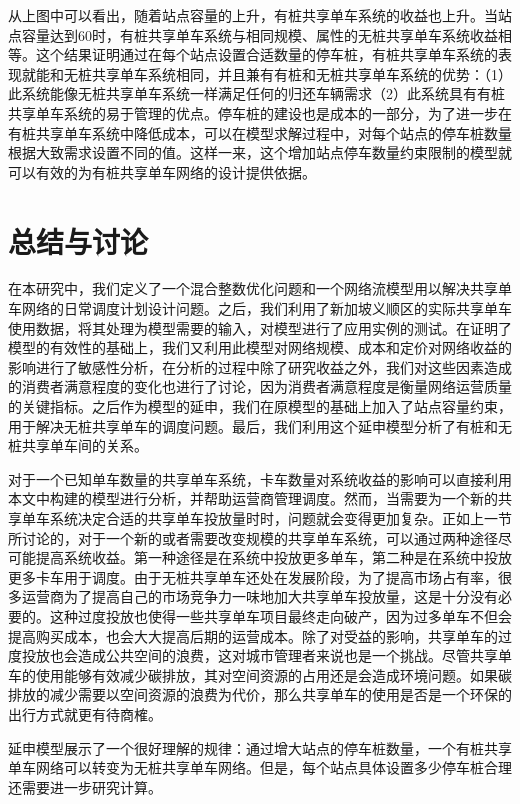 \documentclass[]{tongjithesis}
\numberwithin{equation}{chapter}
\begin{document}
从上图中可以看出，随着站点容量的上升，有桩共享单车系统的收益也上升。当站点容量达到60时，有桩共享单车系统与相同规模、属性的无桩共享单车系统收益相等。这个结果证明通过在每个站点设置合适数量的停车桩，有桩共享单车系统的表现就能和无桩共享单车系统相同，并且兼有有桩和无桩共享单车系统的优势：（1）此系统能像无桩共享单车系统一样满足任何的归还车辆需求（2）此系统具有有桩共享单车系统的易于管理的优点。停车桩的建设也是成本的一部分，为了进一步在有桩共享单车系统中降低成本，可以在模型求解过程中，对每个站点的停车桩数量根据大致需求设置不同的值。这样一来，这个增加站点停车数量约束限制的模型就可以有效的为有桩共享单车网络的设计提供依据。
\clearpage
\chapter{总结与讨论}
在本研究中，我们定义了一个混合整数优化问题和一个网络流模型用以解决共享单车网络的日常调度计划设计问题。之后，我们利用了新加坡义顺区的实际共享单车使用数据，将其处理为模型需要的输入，对模型进行了应用实例的测试。在证明了模型的有效性的基础上，我们又利用此模型对网络规模、成本和定价对网络收益的影响进行了敏感性分析，在分析的过程中除了研究收益之外，我们对这些因素造成的消费者满意程度的变化也进行了讨论，因为消费者满意程度是衡量网络运营质量的关键指标。之后作为模型的延申，我们在原模型的基础上加入了站点容量约束，用于解决无桩共享单车的调度问题。最后，我们利用这个延申模型分析了有桩和无桩共享单车间的关系。

对于一个已知单车数量的共享单车系统，卡车数量对系统收益的影响可以直接利用本文中构建的模型进行分析，并帮助运营商管理调度。然而，当需要为一个新的共享单车系统决定合适的共享单车投放量时时，问题就会变得更加复杂。正如上一节所讨论的，对于一个新的或者需要改变规模的共享单车系统，可以通过两种途径尽可能提高系统收益。第一种途径是在系统中投放更多单车，第二种是在系统中投放更多卡车用于调度。由于无桩共享单车还处在发展阶段，为了提高市场占有率，很多运营商为了提高自己的市场竞争力一味地加大共享单车投放量，这是十分没有必要的。这种过度投放也使得一些共享单车项目最终走向破产，因为过多单车不但会提高购买成本，也会大大提高后期的运营成本。除了对受益的影响，共享单车的过度投放也会造成公共空间的浪费，这对城市管理者来说也是一个挑战。尽管共享单车的使用能够有效减少碳排放，其对空间资源的占用还是会造成环境问题。如果碳排放的减少需要以空间资源的浪费为代价，那么共享单车的使用是否是一个环保的出行方式就更有待商榷。

延申模型展示了一个很好理解的规律：通过增大站点的停车桩数量，一个有桩共享单车网络可以转变为无桩共享单车网络。但是，每个站点具体设置多少停车桩合理还需要进一步研究计算。
\end{document}
